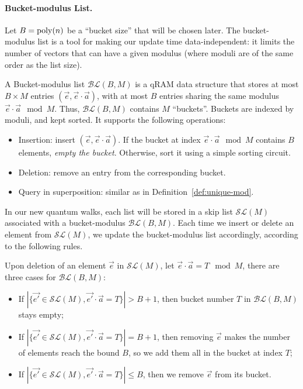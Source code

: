 \paragraph{Bucket-modulus List.}
Let $B = \operatorname{poly}(n)$ be a ``bucket size'' that will be chosen later. The bucket-modulus list is a tool for making our update time data-independent: it limits the number of vectors that can have a given modulus (where moduli are of the same order as the list size).

\begin{definition}\label{def:bucket-mod}
A Bucket-modulus list $\mathcal{BL}(B, M)$ is a qRAM data structure that stores at most $B \times M$ entries $(\vec{e}, \vec{e} \cdot \vec{a})$, with at most $B$ entries sharing the same modulus $\vec{e} \cdot \vec{a} \mod M$. Thus, $\mathcal{BL}(B, M)$ contains $M$ ``buckets''. Buckets are indexed by moduli, and kept sorted. It supports the following operations:
\begin{itemize}
\item Insertion: insert $(\vec{e}, \vec{e} \cdot \vec{a})$. If the bucket at index $\vec{e} \cdot \vec{a} \mod M$ contains $B$ elements, \emph{empty the bucket}. Otherwise, sort it using a simple sorting circuit.
\item Deletion: remove an entry from the corresponding bucket.
\item Query in superposition: similar as in Definition~\ref{def:unique-mod}.
\end{itemize}
\end{definition}

In our new quantum walks, each list will be stored in a skip list $\mathcal{SL}(M)$ associated with a bucket-modulus $\mathcal{BL}(B, M)$. Each time we insert or delete an element from $\mathcal{SL}(M)$, we update the bucket-modulus list accordingly, according to the following rules.

Upon deletion of an element $\vec{e}$ in $\mathcal{SL}(M)$, let $\vec{e} \cdot \vec{a} = T \mod{M}$, there are three cases for $\mathcal{BL}(B, M)$:
\begin{itemize}
\item If $|\{ \vec{e'} \in \mathcal{SL}(M), \vec{e'} \cdot \vec{a} = T \}| > B+1$, then bucket number $T$ in $\mathcal{BL}(B,M)$ stays empty;
\item If $|\{ \vec{e'} \in \mathcal{SL}(M), \vec{e'} \cdot \vec{a} = T \}| = B + 1$, then removing $\vec{e}$ makes the number of elements reach the bound $B$, so we add them all in the bucket at index $T$;
\item If $|\{ \vec{e'} \in \mathcal{SL}(M), \vec{e'} \cdot \vec{a} = T \}| \leq B$, then we remove $\vec{e}$ from its bucket.
\end{itemize}

